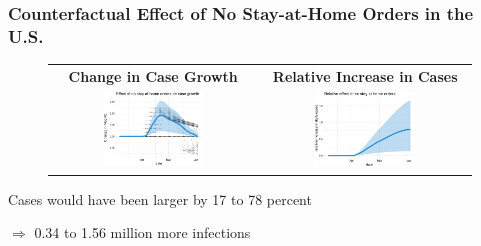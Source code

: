 \documentclass{beamer}
\begin{document}
\begin{frame}
  \frametitle{Counterfactual Effect of No Stay-at-Home Orders in the U.S.}

 
\begin{figure}[ht]
  \begin{minipage}{\linewidth}
    \centering
    \begin{tabular}{cc} 
      \textbf{Change in Case Growth} &  \textbf{Relative Increase in Cases}\\
      \includegraphics[width=0.5\textwidth]{../tables_and_figures/us-shelter-dgrowth_idx}
      &
        \includegraphics[width=0.5\textwidth]{../tables_and_figures/us-shelter-rel_idx}
    \end{tabular}
  \end{minipage}
\end{figure}

Cases would have been larger by   17 to 78 percent
 
 $\Rightarrow$  0.34 to 1.56 million more infections
 
\end{frame}
\end{document}
